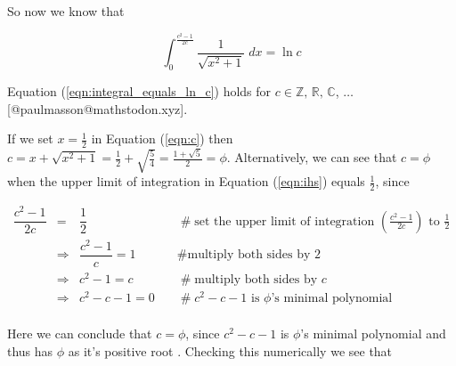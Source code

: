 \documentclass{article}
\theoremstyle{definition}
\begin{document}
\bigskip
\noindent
So now we know that


\begin{equation}
\int_{0}^{\frac{c^2 -1}{2c}} \dfrac{1}{\sqrt{x^{2} + 1}} \; dx = \ln c
\label{eqn:integral_equals_ln_c}
\end{equation}

\bigskip
\bigskip
\noindent
Equation (\ref{eqn:integral_equals_ln_c}) holds for $c \in \mathbb{Z}, 
\, \mathbb{R}, \, \mathbb{C}$, $\hdots$ [@paulmasson@mathstodon.xyz].

\bigskip
\noindent
If we set $x = \frac{1}{2}$ in Equation (\ref{eqn:c})
then $c = x + \sqrt{x^2+1} = \frac{1}{2} + \sqrt{\frac{5}{4}} = 
\frac{1 + \sqrt{5}}{2} = \phi$. Alternatively, we can see that 
$c = \phi$ when the upper limit of integration in
Equation (\ref{eqn:ihs}) equals $\frac{1}{2}$, 
since

\medskip
\begin{equation*}
\begin{array}{llll}
\dfrac{c^2 -1}{2c}
&=& \dfrac{1}{2}			
				&\hspace{1em} \mathrel{\#} \text{set the upper limit of integration 
					$\left ( \frac{c^2 -1}{2c} \right )$ to $\frac{1}{2}$} \\
[10pt]
&\Rightarrow& \dfrac{c^2 -1}{c}	= 1 		
				&\hspace{1em} \mathrel{\#} \text{multiply both sides by 2} \\
[15pt]
&\Rightarrow& c^2 -1 = c 		
				&\hspace{1em} \mathrel{\#} \text{multiply both sides by $c$} \\
[15pt]
&\Rightarrow& c^2 -c -1 = 0		
				&\hspace{1em} \mathrel{\#} \text{$c^2-c-1$ is $\phi$'s 
								minimal polynomial} \\
\end{array}
\end{equation*}

\bigskip
\noindent
Here we can conclude that $c = \phi$, since $c^2 -c -1$ is $\phi$'s 
minimal polynomial and thus has $\phi$ as it's positive root \cite{wiki:golden_ratio}. 
Checking this numerically we see that 
\end{document}
